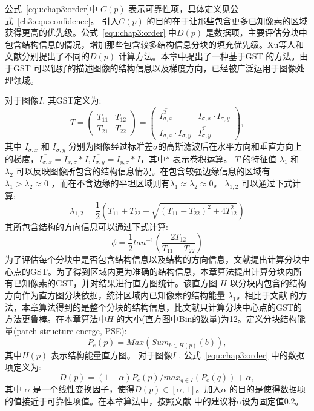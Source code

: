  公式~\ref{equ:chap3:order}中 \(C(p)\) 表示可靠性项\cite{Criminisi04regionfilling}，具体定义见公式~\ref{ch3:equ:confidence}。 引入\(C(p)\) 的目的在于让那些包含更多已知像素的区域获得更高的优先级。公式~\ref{equ:chap3:order} 中\(D(p)\) 是数据项，主要评估分块中包含结构信息的情况，增加那些包含较多结构信息分块的填充优先级。Xu等人\cite{Xu:2010}和文献分别提出了不同的\(D(p)\) 计算方法。本章中提出了一种基于GST 的方法。由于GST 可以很好的描述图像的结构信息以及梯度方向，已经被广泛运用于图像处理领域\cite{Kothe03edgeand}。 \par
  对于图像\(I\), 其GST定义为:
  $$T=\left(\begin{array}{cc}T_{11} & T_{12} \\ T_{21} &T_{22}\end{array}\right)=\left(\begin{array}{cc}\overline{I_{\sigma,x}^2} & \overline{I_{\sigma,x}}\cdot\overline{I_{\sigma,y}} \\ \overline{I_{\sigma,x}}\cdot\overline{I_{\sigma,y}} & \overline{I_{\sigma,y}^2}\end{array}\right),$$
  其中 \(I_{\sigma,x}\) 和 \(I_{\sigma,y}\) 分别为图像经过标准差$\sigma$的高斯滤波后在水平方向和垂直方向上的梯度，\(\overline{I_{\sigma,x}}=I_{x,\sigma}*I, \overline{I_{\sigma,y}}=I_{y,\sigma}*I\)，其中$*$ 表示卷积运算。
   \(T\) 的特征值 \(\lambda_1\) 和 \(\lambda_2\) 可以反映图像所包含的结构信息情况。在包含较强边缘信息的区域有 \(\lambda_1>\lambda_2\approx0\) ，而在不含边缘的平坦区域则有\(\lambda_1\approx\lambda_2\approx0\)。 \( \lambda_{1,2} \) 可以通过下式计算: $$\lambda_{1,2}=\frac{1}{2}\left(T_{11}+T_{22}\pm\sqrt{\left(T_{11}-T_{22}\right)^2+4T^2_{12}}\right)$$
  其所包含结构的方向信息可以通过下式计算:
 $$\phi=\frac{1}{2}tan^{-1}{\left(\frac{2T_{12}}{T_{11}-T_{22}}\right)}$$
 为了评估每个分块中是否包含结构信息以及结构的方向信息，文献提出计算分块中心点的GST。为了得到区域内更为准确的结构信息，本章算法提出计算分块内所有已知像素的GST，并对结果进行直方图统计。该直方图 \(H\) 以分块内包含的结构方向作为直方图分块依据，统计区域内已知像素的结构能量 \(\lambda_1\)。相比于文献 的方法，本章算法得到的是整个分块的结构信息，比文献只计算分块中心点的GST的方法更鲁棒。在本章算法中\(H\) 的大小(直方图中Bin的数量)为12。定义分块结构能量(patch structure energe, PSE):
 $$P_e\left(p\right)=Max\left(Sum_{b\in{H\left(p\right)}}\left(b\right)\right),$$ 
 其中\(H\left(p\right)\) 表示结构能量直方图。 对于图像\(I\) , 公式~\ref{equ:chap3:order} 中的数据项定义为:
 $$D(p)=(1-\alpha)P_e(p)/max_{q\in{I}}(P_e(q))+\alpha,$$ 
 其中 \(\alpha\) 是一个线性变换因子，使得\(D(p)\in{[\alpha,1]}\)。加入\(\alpha\) 的目的是使得数据项的值接近于可靠性项值。在本章算法中，按照文献 中的建议将\(\alpha\)设为固定值0.2。
